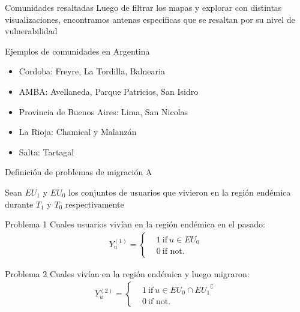 \documentclass[xcolor=x11names]{beamer}
\begin{document}
\begin{frame}{Comunidades resaltadas}
	Luego de filtrar los mapas y explorar con distintas visualizaciones, encontramos antenas especificas que se resaltan por su nivel de vulnerabilidad

	\bigskip

	\begin{block}{Ejemplos de comunidades en Argentina}
		\begin{itemize}
			\item Cordoba: Freyre, La Tordilla, Balnearia
			\item AMBA: Avellaneda, Parque Patricios, San Isidro
			\item Provincia de Buenos Aires: Lima, San Nicolas
			\item La Rioja: Chamical y Malanz\'an
			\item Salta: Tartagal
		\end{itemize}

	\end{block}
\end{frame}



\begin{frame}{Definición de problemas de migración A}

	Sean $EU_{1}$ y $EU_{0}$ los conjuntos de usuarios que vivieron en la región endémica durante $T_1$ y $T_0$ respectivamente
	\begin{block}{Problema 1}
	Cuales usuarios vivían en la región endémica en el pasado:
		\begin{align*}
		Y^{(1)}_u =
		\begin{cases}
		&1 \ \mbox{if} \ u \in EU_{0} \\
		&0 \ \mbox{if not}.
		\end{cases}
		\end{align*}
	\end{block}


	\begin{block}{Problema 2}
		Cuales vivían en la región endémica y luego migraron:
		\begin{align*}
			Y^{(2)}_u =
			\begin{cases}
				&1 \ \mbox{if} \ u \in EU_{0} \cap { EU_{1} }^{\complement}  \\
				&0 \ \mbox{if not}.
			\end{cases}
		\end{align*}
	\end{block}

\end{frame}
\end{document}
